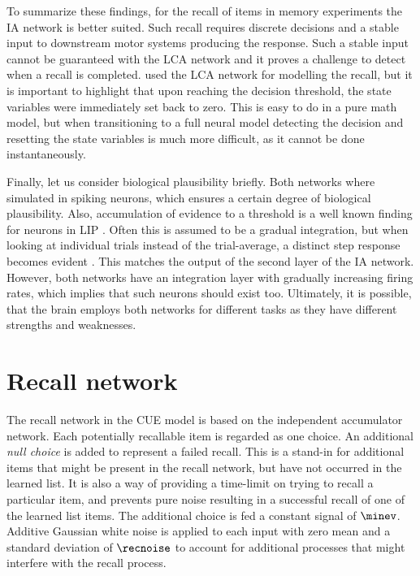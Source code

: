 To summarize these findings, for the recall of items in memory experiments the IA network is better suited.
Such recall requires discrete decisions and a stable input to downstream motor systems producing the response.
Such a stable input cannot be guaranteed with the LCA network and it proves a challenge to detect when a recall is completed.
\Textcite{Sederberg2008} used the LCA network for modelling the recall, but it is important to highlight that upon reaching the decision threshold, the state variables were immediately set back to zero.
This is easy to do in a pure math model, but when transitioning to a full neural model detecting the decision and resetting the state variables is much more difficult, as it cannot be done instantaneously.

Finally, let us consider biological plausibility briefly.
Both networks where simulated in spiking neurons, which ensures a certain degree of biological plausibility.
Also, accumulation of evidence to a threshold is a well known finding for neurons in LIP \parencite{gold2007,smith2004}.
Often this is assumed to be a gradual integration, but when looking at individual trials instead of the trial-average, a distinct step response becomes evident \parencite{latimer2015}.
This matches the output of the second layer of the IA network.
However, both networks have an integration layer with gradually increasing firing rates, which implies that such neurons should exist too.
Ultimately, it is possible, that the brain employs both networks for different tasks as they have different strengths and weaknesses.


\section{Recall network}\label{sec:recall-net}
The recall network in the CUE model is based on the independent accumulator network.
Each potentially recallable item is regarded as one choice.
An additional \emph{null choice} is added to represent a failed recall.
This is a stand-in for additional items that might be present in the recall network, but have not occurred in the learned list.
It is also a way of providing a time-limit on trying to recall a particular item, and prevents pure noise resulting in a successful recall of one of the learned list items.
The additional choice is fed a constant signal of $\minev$.
Additive Gaussian white noise is applied to each input with zero mean and a standard deviation of $\recnoise$ to account for additional processes that might interfere with the recall process.

